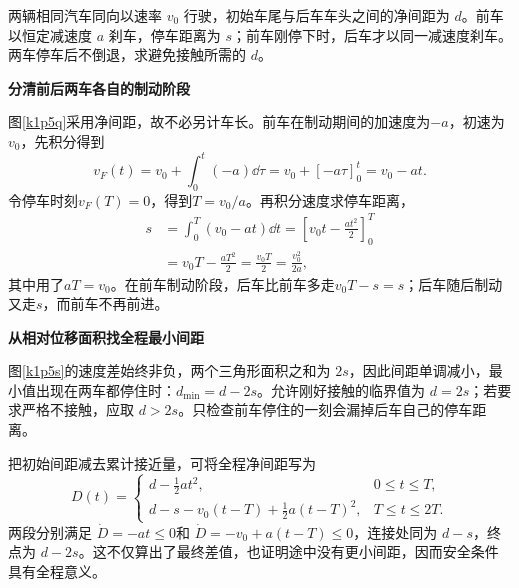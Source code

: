\begin{question}\begin{example}[延迟刹车的安全间距]\label{k1p5}
两辆相同汽车同向以速率 $v_0$ 行驶，初始车尾与后车车头之间的净间距为 $d$。前车以恒定减速度 $a$ 刹车，停车距离为 $s$；前车刚停下时，后车才以同一减速度刹车。两车停车后不倒退，求避免接触所需的 $d$。\end{example}
\end{question}
\begin{solution}\textbf{分清前后两车各自的制动阶段}\par\nobreak
图\ref{k1p5q}采用净间距，故不必另计车长。前车在制动期间的加速度为$-a$，初速为$v_0$，先积分得到
\[
v_F(t)=v_0+\int_0^t(-a)\dd\tau
=v_0+[-a\tau]_0^t=v_0-at.
\]
令停车时刻$v_F(T)=0$，得到$T=v_0/a$。再积分速度求停车距离，
\begin{align*}
s&=\int_0^T(v_0-at)\dd t
=\left[v_0t-\frac{at^2}{2}\right]_0^T\\
&=v_0T-\frac{aT^2}{2}
=\frac{v_0T}{2}=\frac{v_0^2}{2a},
\end{align*}
其中用了$aT=v_0$。在前车制动阶段，后车比前车多走$v_0T-s=s$；后车随后制动又走$s$，而前车不再前进。



\par\medskip{}\noindent\textbf{从相对位移面积找全程最小间距}\par\nobreak
图\ref{k1p5s}的速度差始终非负，两个三角形面积之和为 $2s$，因此间距单调减小，最小值出现在两车都停住时：$d_{\min}=d-2s$。允许刚好接触的临界值为 $\boxed{d=2s}$；若要求严格不接触，应取 $\boxed{d>2s}$。只检查前车停住的一刻会漏掉后车自己的停车距离。

把初始间距减去累计接近量，可将全程净间距写为
\[D(t)=\begin{cases}d-\tfrac12at^2,&0\le t\le T,\\
d-s-v_0(t-T)+\tfrac12a(t-T)^2,&T\le t\le2T.
\end{cases}\]
两段分别满足 $\dot D=-at\le0$和 $\dot D=-v_0+a(t-T)\le0$，连接处同为 $d-s$，终点为 $d-2s$。这不仅算出了最终差值，也证明途中没有更小间距，因而安全条件具有全程意义。


\end{solution}

